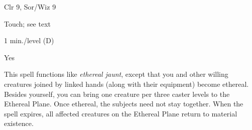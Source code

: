 
\begin{description*}
\item[Level:] Clr 9, Sor/Wiz 9
\item[Range:] Touch; see text
\item[Duration:] 1 min./level (D)
\item[Spell Resistance:] Yes
\end{description*}

This spell functions like \textit{ethereal jaunt}, except that you and other willing
creatures joined by linked hands (along with their equipment) become ethereal.
Besides yourself, you can bring one creature per three caster levels to the Ethereal
Plane. Once ethereal, the subjects need not stay together.
When the spell expires, all affected creatures on the Ethereal Plane return to
material existence.